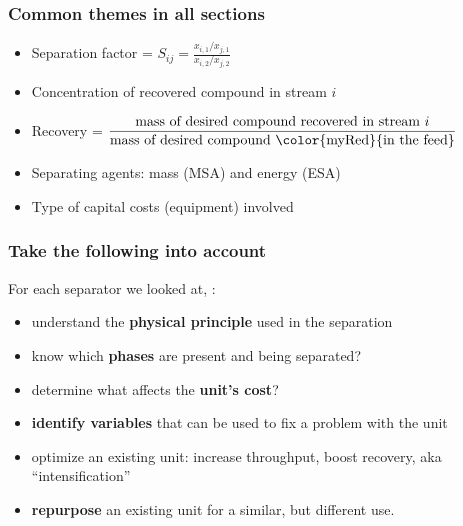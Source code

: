 \begin{frame}\frametitle{Common themes in all sections}
	\begin{itemize}
		\item	Separation factor = $S_{ij} = \displaystyle \frac{x_{i,1} / x_{j,1}}{x_{i,2} / x_{j,2}}$
		\item	Concentration of recovered compound in stream $i$
		\item	Recovery = $\displaystyle\frac{\text{mass of desired compound recovered in stream~} i}{\text{mass of desired compound {\color{myRed}{in the feed}}}}$
		\item	Separating agents: mass (MSA) and energy (ESA)
		\item	Type of capital costs (equipment) involved
	\end{itemize}
\end{frame}

\begin{frame}\frametitle{Take the following into account}
	For each separator we looked at, {\color{myOrange}{please aim to}}:
	\vspace{12pt}
	\begin{itemize}
		\item	understand the \textbf{physical principle} used in the separation
		\item	know which \textbf{phases} are present and being separated?
		\item	determine what affects the \textbf{unit's cost}?
		\item	\textbf{identify variables} that can be used to fix a problem with the unit
		\item	optimize an existing unit: increase throughput, boost recovery, aka ``intensification''
		\item	\textbf{repurpose} an existing unit for a similar, but different use.
	\end{itemize}
\end{frame}

